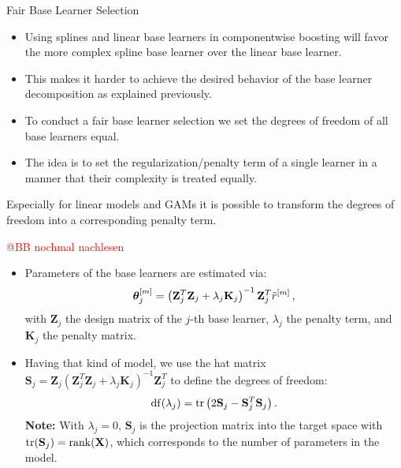 \begin{vbframe}{Fair Base Learner Selection}

\begin{itemize}

  \item
    Using splines and linear base learners in componentwise boosting will favor
    the more complex spline base learner over the linear base learner.

  \item
    This makes it harder to achieve the desired behavior of the base learner
    decomposition as explained previously.

  \item
    To conduct a fair base learner selection we set the degrees of freedom of all base learners equal.

  \item
    The idea is to set the regularization/penalty term of a single learner in a manner that their complexity is treated equally.

\end{itemize}

\framebreak


Especially for linear models and GAMs it is possible to transform the degrees of freedom into a corresponding penalty term.

\textcolor{red}{@BB nochmal nachlesen}

\begin{itemize}

  \item
    Parameters of the base learners are estimated via:
    $$
    \bm{\theta}^{[m]}_j = \left(\mathbf{Z}_j^T \mathbf{Z}_j + \lambda_j \mathbf{K}_j
    \right)^{-1}\mathbf{Z}_j^T \tilde{r}^{[m]}\,,
    $$
    with $\mathbf{Z}_j$ the design matrix of the $j$-th base learner,
    $\lambda_j$ the penalty term, and $\mathbf{K}_j$ the penalty matrix.

  \item
    Having that kind of model, we use the hat matrix
    $\mathbf{S}_j = \mathbf{Z}_j\left(\mathbf{Z}_j^T \mathbf{Z}_j +
    \lambda_j \mathbf{K}_j\right)^{-1}\mathbf{Z}_j^T$ to define the degrees of
    freedom:
    $$
    \operatorname{df}(\lambda_j) = \operatorname{tr}\left(2\mathbf{S}_j - \mathbf{S}_j^T
    \mathbf{S}_j\right).
    $$
    \textbf{Note:} With $\lambda_j = 0$, $\mathbf{S}_j$ is the projection matrix
    into the target space with
    $\operatorname{tr}(\mathbf{S}_j) = \operatorname{rank}(\mathbf{X})$, which corresponds to
    the number of parameters in the model.


\end{itemize}
\end{vbframe}
